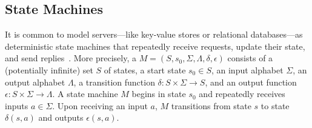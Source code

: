 
\subsection{State Machines}
It is common to model servers---like key-value stores or relational
databases---as deterministic state machines that repeatedly receive requests,
update their state, and send replies~\cite{schneider1990implementing,
lamport1998part}. More precisely, a  $M =
(S, s_0, \Sigma, \Lambda, \delta, \epsilon)$ consists of
  a (potentially infinite) set $S$ of states,
  a start state $s_0 \in S$,
  an input alphabet $\Sigma$,
  an output alphabet $\Lambda$,
  a transition function $\delta: S \times \Sigma \to S$, and
  an output function $\epsilon: S \times \Sigma \to \Lambda$.
A state machine $M$ begins in state $s_0$ and repeatedly receives inputs $a \in
\Sigma$. Upon receiving an input $a$, $M$ transitions from state $s$ to state
$\delta(s, a)$ and outputs $\epsilon(s, a)$.

